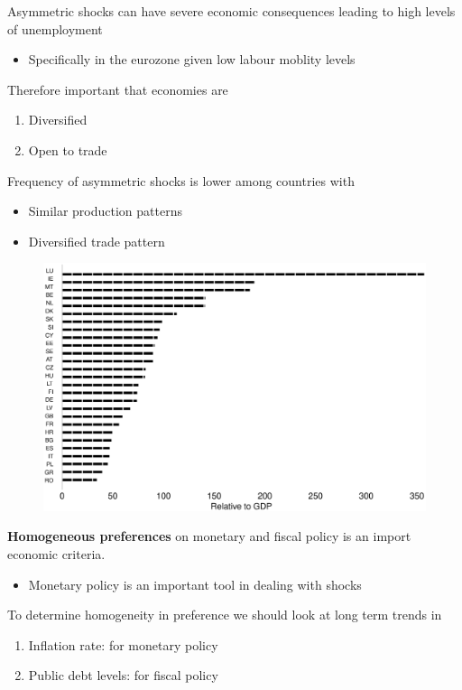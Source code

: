 \documentclass{beamer}
\begin{document}
\begin{frame}
  Asymmetric shocks can have severe economic consequences leading to high levels of unemployment
  \begin{itemize}
    \item Specifically in the eurozone given low labour moblity levels
  \end{itemize}
  \medskip
  Therefore important that economies are 
  \begin{enumerate}
    \item Diversified
    \item Open to trade
  \end{enumerate}
  \medskip 
  Frequency of asymmetric shocks is lower among countries with
  \begin{itemize}
    \item Similar production patterns
    \item Diversified trade pattern
  \end{itemize}
\end{frame}

\begin{frame}
  \begin{figure}
    \includegraphics[scale=.3]{openness.eps}
  \end{figure}
\end{frame}


\begin{frame}
  \textbf{Homogeneous preferences} on monetary and fiscal policy is an import economic criteria. 
  \begin{itemize}
    \item Monetary policy is an important tool in dealing with shocks
  \end{itemize}
  \medskip
  To determine homogeneity in preference we should look at long term trends in
  \begin{enumerate}
    \item Inflation rate: for monetary policy
    \item Public debt levels: for fiscal policy
  \end{enumerate}
\end{frame}
\end{document}
